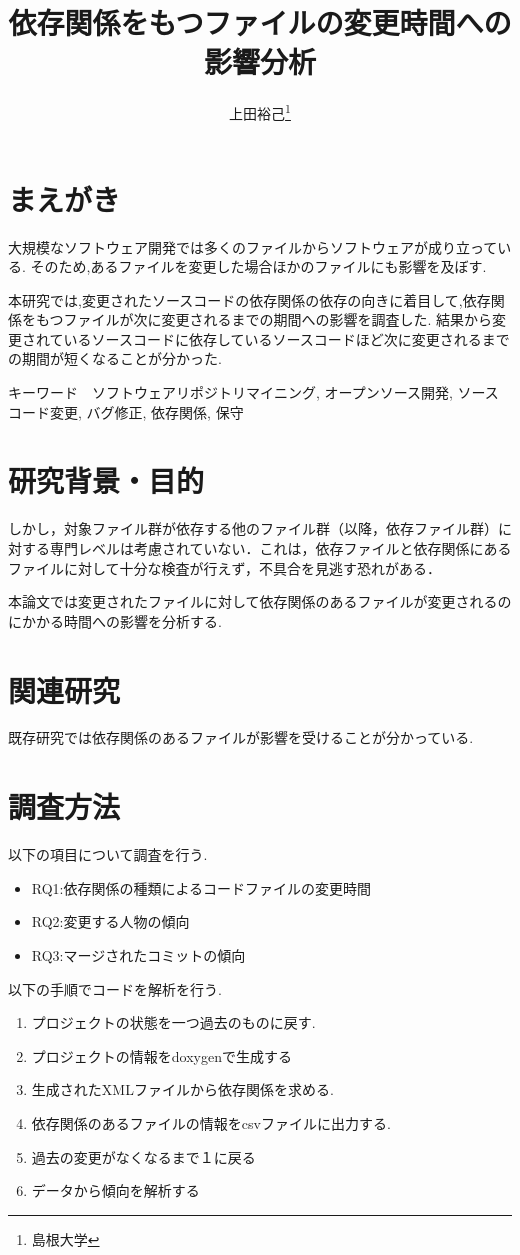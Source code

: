 \documentclass{jsarticle}
\begin{document}
\title{依存関係をもつファイルの変更時間への影響分析}
\author{上田裕己\thanks{島根大学}}
\date{}
\maketitle

\section{まえがき}
大規模なソフトウェア開発では多くのファイルからソフトウェアが成り立っている.
そのため,あるファイルを変更した場合ほかのファイルにも影響を及ぼす.

本研究では,変更されたソースコードの依存関係の依存の向きに着目して,依存関係をもつファイルが次に変更されるまでの期間への影響を調査した.
  結果から変更されているソースコードに依存しているソースコードほど次に変更されるまでの期間が短くなることが分かった.
  
キーワード　ソフトウェアリポジトリマイニング, オープンソース開発, ソースコード変更, バグ修正, 依存関係, 保守

\section{研究背景・目的} 
しかし，対象ファイル群が依存する他のファイル群（以降，依存ファイル群）に対する専門レベルは考慮されていない．これは，依存ファイルと依存関係にあるファイルに対して十分な検査が行えず，不具合を見逃す恐れがある．

本論文では変更されたファイルに対して依存関係のあるファイルが変更されるのにかかる時間への影響を分析する.

\section{関連研究}
既存研究では依存関係のあるファイルが影響を受けることが分かっている.


\section{調査方法}
以下の項目について調査を行う.
\begin{itemize}
\item RQ1:依存関係の種類によるコードファイルの変更時間
\item RQ2:変更する人物の傾向
\item RQ3:マージされたコミットの傾向
\end{itemize}


以下の手順でコードを解析を行う.
\begin{enumerate}
\item プロジェクトの状態を一つ過去のものに戻す.
\item プロジェクトの情報をdoxygenで生成する
\item 生成されたXMLファイルから依存関係を求める.
\item 依存関係のあるファイルの情報をcsvファイルに出力する.
\item 過去の変更がなくなるまで１に戻る
\item データから傾向を解析する
\end{enumerate}
\end{document}
